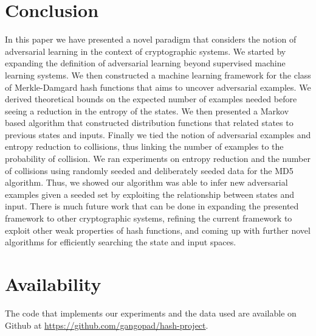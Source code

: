 \documentclass[letterpaper,twocolumn,10pt]{article}
\begin{document}
\section*{Conclusion}
In this paper we have presented a novel paradigm that considers the notion of adversarial learning in the context of cryptographic systems. We started by expanding the definition of adversarial learning beyond supervised machine learning systems. We then constructed a machine learning framework for the class of Merkle-Damgard hash functions that aims to uncover adversarial examples. We derived theoretical bounds on the expected number of examples needed before seeing a reduction in the entropy of the states. We then presented a Markov based algorithm that constructed distribution functions that related states to previous states and inputs. Finally we tied the notion of adversarial examples and entropy reduction to collisions, thus linking the number of examples to the probability of collision. We ran experiments on entropy reduction and the number of collisions using randomly seeded and deliberately seeded data for the MD5 algorithm. Thus, we showed our algorithm was able to infer new adversarial examples given a seeded set by exploiting the relationship between states and input. There is much future work that can be done in expanding the presented framework to other cryptographic systems, refining the current framework to exploit other weak properties of hash functions, and coming up with further novel algorithms for efficiently searching the state and input spaces. 


\section*{Availability}

The code that implements our experiments and the data used are available on Github at \url{https://github.com/gangopad/hash-project}. 





\end{document}
